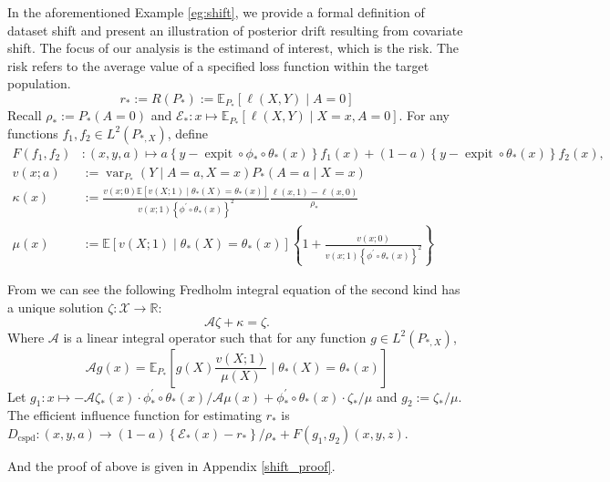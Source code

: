 \documentclass[11pt]{article}
\begin{document}
\begin{example1}[continued]
In the aforementioned Example \ref{eg:shift}, we provide a formal definition of dataset shift and present an illustration of posterior drift resulting from covariate shift. The focus of our analysis is the estimand of interest, which is the risk. The risk refers to the average value of a specified loss function within the target population.
$$
r_*:=R\left(P_*\right):=\mathbb{E}_{P_*}[\ell(X,Y) \mid A=0]
$$
Recall $\rho_*:=P_*(A=0)$ and $\mathcal{E}_*: x \mapsto \mathbb{E}_{P_*}[\ell(X, Y) \mid X=x, A=0]$. For any functions $f_1,f_2 \in L^2(P_{*,X})$, define
\begin{equation}
\begin{aligned}
F\left(f_1, f_2\right) & : (x,y,a) \mapsto a\left\{y-\operatorname{expit} \circ \phi_* \circ \theta_*(x)\right\} f_1(x)+(1-a)\left\{y-\operatorname{expit} \circ \theta_*(x)\right\} f_2(x), \\
v(x ; a) & :=\operatorname{var}_{P_*}(Y \mid A=a, X=x) P_*(A=a \mid X=x) \\
\kappa(x) & :=\frac{v(x ; 0) \mathbb{E}\left[v(X ; 1) \mid \theta_*(X)=\theta_*(x)\right]}{v(x ; 1)\left\{\phi^{\prime} \circ \theta_*(x)\right\}^2} \frac{\ell(x, 1)-\ell(x, 0)}{\rho_*} \\
\mu(x) & :=\mathbb{E}\left[v(X ; 1) \mid \theta_*(X)=\theta_*(x)\right]\left\{1+\frac{v(x ; 0)}{v(x ; 1)\left\{\phi^{\prime} \circ \theta_*(x)\right\}^2}\right\}
\end{aligned}
\end{equation}

From \cite{qiu2023efficient} we can see the following Fredholm integral equation of the second kind has a unique solution $\zeta:\mathcal{X} \rightarrow \mathbb{R}$:
\begin{equation}
\mathscr{A} \zeta+\kappa=\zeta .
\end{equation}
Where $\mathscr{A}$ is a linear integral operator such that for any function $g \in L^2(P_{*,X})$,
$$
\mathscr{A} g(x)=\mathbb{E}_{P_*}\left[g(X) \frac{v(X ; 1)}{\mu(X)} \mid \theta_*(X)=\theta_*(x)\right]
$$
Let $g_1: x \mapsto-\mathscr{A} \zeta_*(x) \cdot \phi_*^{\prime} \circ \theta_*(x) / \mathscr{A} \mu(x)+\phi_*^{\prime} \circ \theta_*(x) \cdot \zeta_* / \mu$ and $g_2:=\zeta_* / \mu$. The efficient influence function for estimating $r_*$ is $D_{\text{cspd}}:(x,y,a)\rightarrow (1-a)\left\{\mathcal{E}_*(x)-r_*\right\} / \rho_*+F\left(g_1, g_2\right)(x,y,z)$.

And the proof of above is given in Appendix \ref{shift_proof}.

\end{example1}
\end{document}
